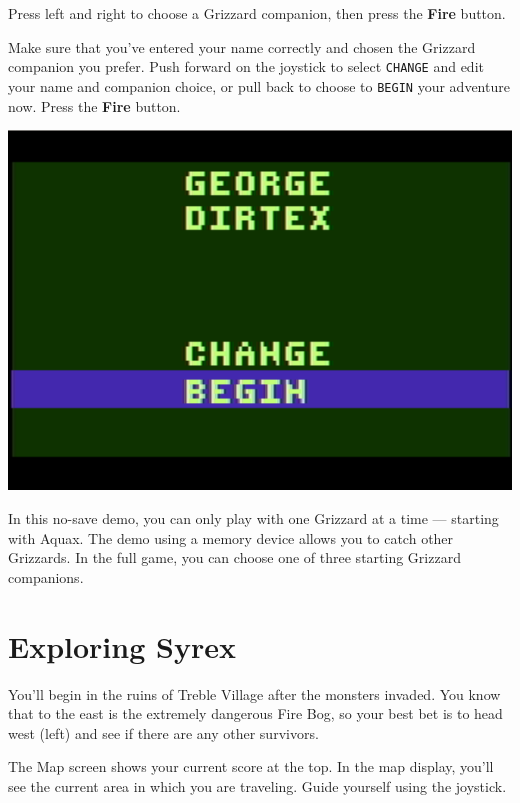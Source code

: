 \documentclass[9pt,twocolumn,openany,article]{memoir}
\begin{document}
Press left  and right  to choose  a Grizzard  companion, then  press the
\textbf{Fire} button.

Make  sure  that you've  entered  your  name  correctly and  chosen  the
Grizzard companion  you prefer. Push  forward on the joystick  to select
\texttt{CHANGE} and edit your name and companion choice, or pull back to
choose    to   \texttt{BEGIN}    your   adventure    now.   Press    the
\textbf{Fire} button.

\begin{center}
  \includegraphics[width=.75\columnwidth]{../Manual/ConfirmNewGameNTSC.png}
\end{center}

\fi
\fi
\ifdefined\NOSAVE

In this no-save demo, you can only  play with one Grizzard at a time ---
starting with Aquax. The demo using  a memory device allows you to catch
other Grizzards. In the full game,  you can choose one of three starting
Grizzard companions.

\fi

\section{Exploring Syrex}

You'll begin in the ruins of  Treble Village after the monsters invaded.
You know that to  the east is the extremely dangerous  Fire Bog, so your
best  bet   is  to  head   west  (left)  and   see  if  there   are  any
other survivors.

The Map screen shows your current score  at the top. In the map display,
you'll see the  current area in which you are  traveling. Guide yourself
using the joystick.
\end{document}
